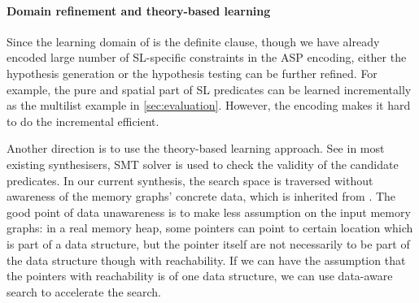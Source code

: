 \paragraph{Domain refinement and theory-based learning}

Since the learning domain of \popper is the definite clause, though we
have already encoded large number of SL-specific constraints in the ASP
encoding, either the hypothesis generation or the hypothesis testing
can be further refined. For example, the pure and spatial part of SL
predicates can be learned incrementally as the multilist example in
\autoref{sec:evaluation}. However, the encoding makes it hard to do
the incremental efficient.

Another direction is to use the theory-based learning approach. See in
most existing synthesisers, SMT solver is used to check the validity
of the candidate predicates. In our current synthesis, the search
space is traversed without awareness of the memory graphs' concrete
data, which is inherited from \popper. The good point of data
unawareness is to make less assumption on the input memory graphs: in
a real memory heap, some pointers can point to certain location which
is part of a data structure, but the pointer itself are not
necessarily to be part of the data structure though with reachability.
If we can have the assumption that the pointers with reachability is
of one data structure, we can use data-aware search to accelerate the
search.
